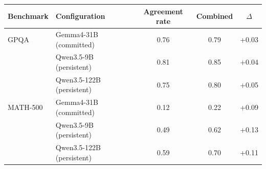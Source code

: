 \begin{tabular}{llccc}
\toprule
Benchmark & Configuration & Agreement rate & Combined & $\Delta$ \\
\midrule
GPQA & Gemma4-31B (committed) & 0.76 & 0.79 & +0.03 \\
 & Qwen3.5-9B (persistent) & 0.81 & 0.85 & +0.04 \\
 & Qwen3.5-122B (persistent) & 0.75 & 0.80 & +0.05 \\
MATH-500 & Gemma4-31B (committed) & 0.12 & 0.22 & +0.09 \\
 & Qwen3.5-9B (persistent) & 0.49 & 0.62 & +0.13 \\
 & Qwen3.5-122B (persistent) & 0.59 & 0.70 & +0.11 \\
\bottomrule
\end{tabular}
